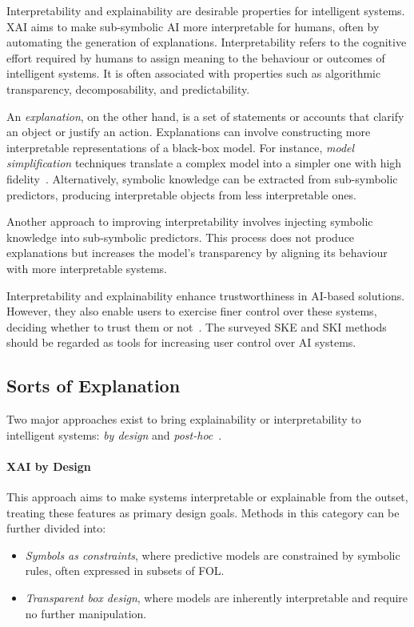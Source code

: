 Interpretability and explainability are desirable properties for intelligent systems.
%
\Gls{XAI} aims to make sub-symbolic \gls{AI} more interpretable for humans, often by automating the generation of explanations.
%
Interpretability refers to the cognitive effort required by humans to assign meaning to the behaviour or outcomes of intelligent systems.
%
It is often associated with properties such as algorithmic transparency, decomposability, and predictability.


An \emph{explanation}, on the other hand, is a set of statements or accounts that clarify an object or justify an action.
%
Explanations can involve constructing more interpretable representations of a black-box model.
%
For instance, \emph{model simplification} techniques translate a complex model into a simpler one with high fidelity~\cite{DBLP:conf/kdd/TolomeiSHL17,DBLP:journals/csur/GuidottiMRTGP19}.
%
Alternatively, symbolic knowledge can be extracted from sub-symbolic predictors, producing interpretable objects from less interpretable ones.


Another approach to improving interpretability involves injecting symbolic knowledge into sub-symbolic predictors.
%
This process does not produce explanations but increases the model's transparency by aligning its behaviour with more interpretable systems.

Interpretability and explainability enhance trustworthiness in \gls{AI}-based solutions.
%
However, they also enable users to exercise finer control over these systems, deciding whether to trust them or not~\cite{10.1214/21-SS133}.
%
The surveyed \gls{SKE} and \gls{SKI} methods should be regarded as tools for increasing user control over \gls{AI} systems.


\subsection{Sorts of Explanation}\label{subsec:sorts-of-explanation}
%
Two major approaches exist to bring explainability or interpretability to intelligent systems: \emph{by design} and \emph{post-hoc}~\cite{DBLP:conf/atal/CiattoSOC20,DBLP:journals/inffus/ArrietaRSBTBGGM20,DBLP:journals/csur/GuidottiMRTGP19}.


\paragraph{\Gls{XAI} by Design}
\label{par:xai-by-design}
%
This approach aims to make systems interpretable or explainable from the outset, treating these features as primary design goals.
%
Methods in this category can be further divided into:
%
\begin{itemize}
    \item \emph{Symbols as constraints}, where predictive models are constrained by symbolic rules, often expressed in subsets of \gls{FOL}.
    \item \emph{Transparent box design}, where models are inherently interpretable and require no further manipulation.
\end{itemize}

